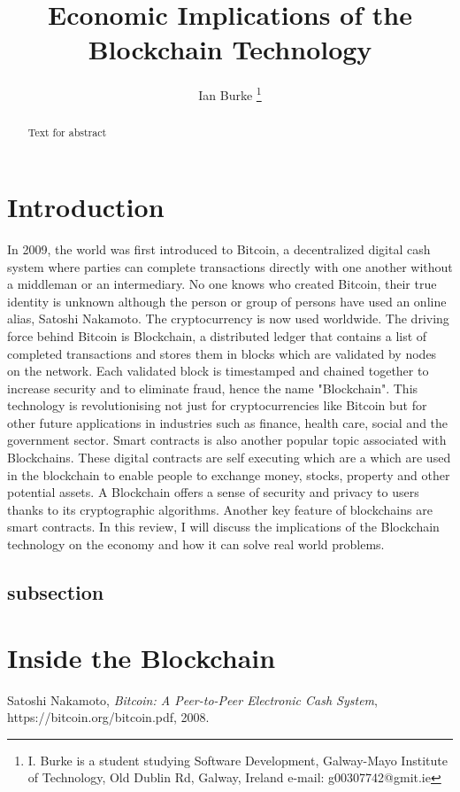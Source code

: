 \documentclass[report]{IEEEtran}
\begin{document}
\title{Economic Implications of the Blockchain Technology}
\author{Ian Burke %
\thanks{I. Burke is a student studying
Software Development, Galway-Mayo Institute of Technology, Old Dublin Rd, Galway, Ireland e-mail: g00307742@gmit.ie}%
}

\maketitle

\begin{abstract}
Text for abstract
\end{abstract}


\section{Introduction}
In 2009, the world was first introduced to Bitcoin, a decentralized digital cash system where parties can complete transactions directly with one another without a middleman or an intermediary. No one knows who created Bitcoin, their true identity is unknown although the person or group of persons have used an online alias, Satoshi Nakamoto. The cryptocurrency is now used worldwide. The driving force behind Bitcoin is Blockchain, a distributed ledger that contains a list of completed transactions and stores them in blocks which are validated by nodes on the network. Each validated block is timestamped and chained together to increase security and to eliminate fraud, hence the name "Blockchain". This technology is revolutionising not just for cryptocurrencies like Bitcoin but for other future applications in industries such as finance, health care, social and the government sector. Smart contracts is also another popular topic associated with Blockchains. These digital contracts are self executing which are a which are used in the blockchain to enable people to exchange money, stocks, property and other potential assets. A Blockchain offers a sense of security and privacy to users thanks to its cryptographic algorithms. Another key feature of blockchains are smart contracts.  In this review, I will discuss the implications of the Blockchain technology on the economy and how it can solve real world problems.
\subsection{subsection}

\section{Inside the Blockchain }

\begin{thebibliography}{1}

Satoshi Nakamoto, \emph{Bitcoin: A Peer-to-Peer Electronic Cash System}, https://bitcoin.org/bitcoin.pdf, 2008.

\end{thebibliography}
\end{document}
